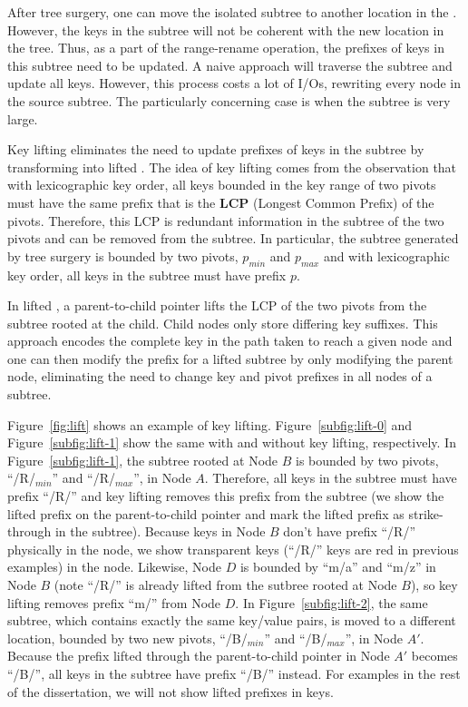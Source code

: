 After tree surgery, one can move the isolated subtree to another location in
the \bet.
However, the keys in the subtree will not be coherent with the new location in
the tree.
Thus, as a part of the range-rename operation, the prefixes of keys in this
subtree need to be updated.
A naive approach will traverse the subtree and update all keys.
However, this process costs a lot of I/Os, rewriting every node in the source
subtree.
The particularly concerning case is when the subtree is very large.

Key lifting eliminates the need to update prefixes of keys in the subtree by
transforming \bets into lifted \bets.
The idea of key lifting comes from the observation that with lexicographic key
order, all keys bounded in the key range of two pivots must have the same prefix
that is the \textbf{LCP} (Longest Common Prefix) of the pivots.
Therefore, this LCP is redundant information in the subtree of the two pivots
and can be removed from the subtree.
In particular, the subtree generated by tree surgery is bounded by two pivots,
$p_{min}$ and $p_{max}$ and with lexicographic key order, all keys in the
subtree must have prefix $p$.

In lifted \bets, a parent-to-child pointer lifts the LCP of the two pivots from
the subtree rooted at the child.
Child nodes only store differing key suffixes.
This approach encodes the complete key in the path taken to reach a given node
and one can then modify the prefix for a lifted subtree by only modifying the
parent node, eliminating the need to change key and pivot prefixes in all nodes
of a subtree.

Figure~\ref{fig:lift} shows an example of key lifting.
Figure~\ref{subfig:lift-0} and Figure~\ref{subfig:lift-1} show the same \bet
with and without key lifting, respectively.
In Figure~\ref{subfig:lift-1}, the subtree rooted at Node $B$ is
bounded by two pivots, ``/R/$_{min}$'' and ``/R/$_{max}$'', in Node $A$.
Therefore, all keys in the subtree must have prefix ``/R/'' and key lifting
removes this prefix from the subtree
(we show the lifted prefix on the parent-to-child pointer and mark the lifted
prefix as strike-through in the subtree).
Because keys in Node $B$ don't have prefix ``/R/'' physically in the node,
we show transparent keys (``/R/'' keys are red in previous examples) in the node.
Likewise, Node $D$ is bounded by ``m/a'' and ``m/z'' in Node $B$
(note ``/R/'' is already lifted from the sutbree rooted at Node $B$),
so key lifting removes prefix ``m/'' from Node $D$.
In Figure~\ref{subfig:lift-2}, the same subtree, which contains exactly the
same key/value pairs, is moved to a different location, bounded by two new
pivots, ``/B/$_{min}$'' and ``/B/$_{max}$'', in Node $A'$.
Because the prefix lifted through the parent-to-child pointer in Node $A'$
becomes ``/B/'', all keys in the subtree have prefix ``/B/'' instead.
For examples in the rest of the dissertation, we will not show lifted prefixes
in keys.


